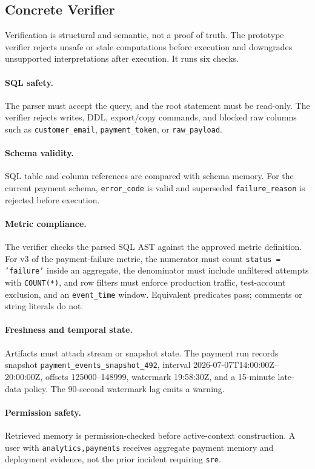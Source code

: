\documentclass[10pt]{article}
\newcommand{\code}[1]{\texttt{#1}}
\begin{document}
\subsection{Concrete Verifier}
Verification is structural and semantic, not a proof of truth. The prototype verifier rejects unsafe or stale computations before execution and downgrades unsupported interpretations after execution. It runs six checks.

\paragraph{SQL safety.} The parser must accept the query, and the root statement must be read-only. The verifier rejects writes, DDL, export/copy commands, and blocked raw columns such as \code{customer\_email}, \code{payment\_token}, or \code{raw\_payload}.

\paragraph{Schema validity.} SQL table and column references are compared with schema memory. For the current payment schema, \code{error\_code} is valid and superseded \code{failure\_reason} is rejected before execution.

\paragraph{Metric compliance.} The verifier checks the parsed SQL AST against the approved metric definition. For v3 of the payment-failure metric, the numerator must count \code{status = 'failure'} inside an aggregate, the denominator must include unfiltered attempts with \code{COUNT(*)}, and row filters must enforce production traffic, test-account exclusion, and an \code{event\_time} window. Equivalent predicates pass; comments or string literals do not.

\paragraph{Freshness and temporal state.} Artifacts must attach stream or snapshot state. The payment run records snapshot \code{payment\_events\_snapshot\_492}, interval 2026-07-07T14:00:00Z--20:00:00Z, offsets 125000--148999, watermark 19:58:30Z, and a 15-minute late-data policy. The 90-second watermark lag emits a warning.

\paragraph{Permission safety.} Retrieved memory is permission-checked before active-context construction. A user with \code{analytics,payments} receives aggregate payment memory and deployment evidence, not the prior incident requiring \code{sre}.
\end{document}
